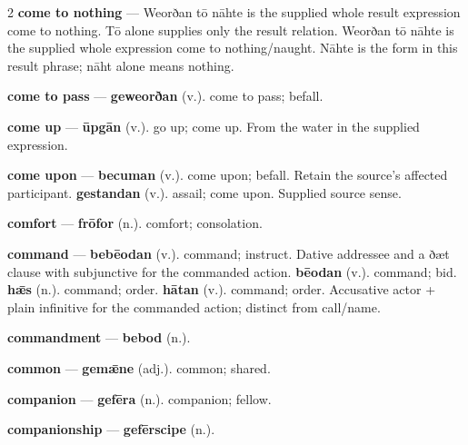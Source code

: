 \begin{multicols}{2}
\textbf{come to nothing} — Weorðan tō nāhte is the supplied whole result expression come to nothing. Tō alone supplies only the result relation. Weorðan tō nāhte is the supplied whole expression come to nothing/naught. Nāhte is the form in this result phrase; nāht alone means nothing.\par
\textbf{come to pass} — \textbf{geweorðan} (v.). come to pass; befall.\par
\textbf{come up} — \textbf{ūpgān} (v.). go up; come up. From the water in the supplied expression.\par
\textbf{come upon} — \textbf{becuman} (v.). come upon; befall. Retain the source's affected participant. \textbf{gestandan} (v.). assail; come upon. Supplied source sense.\par
\textbf{comfort} — \textbf{frōfor} (n.). comfort; consolation.\par
\textbf{command} — \textbf{bebēodan} (v.). command; instruct. Dative addressee and a ðæt clause with subjunctive for the commanded action. \textbf{bēodan} (v.). command; bid. \textbf{hǣs} (n.). command; order. \textbf{hātan} (v.). command; order. Accusative actor + plain infinitive for the commanded action; distinct from call/name.\par
\textbf{commandment} — \textbf{bebod} (n.).\par
\textbf{common} — \textbf{gemǣne} (adj.). common; shared.\par
\textbf{companion} — \textbf{gefēra} (n.). companion; fellow.\par
\textbf{companionship} — \textbf{gefērscipe} (n.).\par

\end{multicols}
